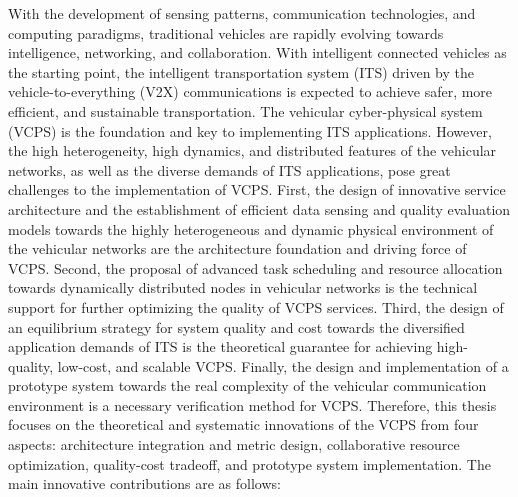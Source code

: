 \begin{eabstract}	%

With the development of sensing patterns, communication technologies, and computing paradigms, traditional vehicles are rapidly evolving towards intelligence, networking, and collaboration. With intelligent connected vehicles as the starting point, the intelligent transportation system (ITS) driven by the vehicle-to-everything (V2X) communications is expected to achieve safer, more efficient, and sustainable transportation. The vehicular cyber-physical system (VCPS) is the foundation and key to implementing ITS applications. However, the high heterogeneity, high dynamics, and distributed features of the vehicular networks, as well as the diverse demands of ITS applications, pose great challenges to the implementation of VCPS. First, the design of innovative service architecture and the establishment of efficient data sensing and quality evaluation models towards the highly heterogeneous and dynamic physical environment of the vehicular networks are the architecture foundation and driving force of VCPS. Second, the proposal of advanced task scheduling and resource allocation towards dynamically distributed nodes in vehicular networks is the technical support for further optimizing the quality of VCPS services. Third, the design of an equilibrium strategy for system quality and cost towards the diversified application demands of ITS is the theoretical guarantee for achieving high-quality, low-cost, and scalable VCPS. Finally, the design and implementation of a prototype system towards the real complexity of the vehicular communication environment is a necessary verification method for VCPS. Therefore, this thesis focuses on the theoretical and systematic innovations of the VCPS from four aspects: architecture integration and metric design, collaborative resource optimization, quality-cost tradeoff, and prototype system implementation. The main innovative contributions are as follows:


\end{eabstract}
